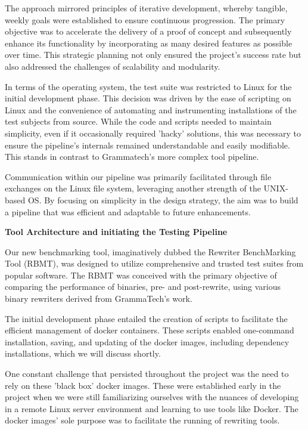 \documentclass[a4paper,11pt,oneside]{report}
\begin{document}
The approach mirrored principles of iterative development, whereby tangible, weekly goals were
established to ensure continuous progression. The primary objective
was to accelerate the delivery of a proof of concept and subsequently
enhance its functionality by incorporating as many desired features as possible over time.
This strategic planning not only ensured the project's success rate but also addressed the
challenges of scalability and modularity.

In terms of the operating system, the test suite was restricted to Linux for
the initial development phase. This decision was driven by the ease of scripting on Linux and
the convenience of automating and instrumenting installations of the test subjects from
source. While the code and scripts needed to maintain simplicity, even if it occasionally
required 'hacky' solutions, this was necessary to ensure the pipeline's internals remained
understandable and easily modifiable. This stands in contrast to Grammatech’s more complex tool pipeline.

Communication within our pipeline was primarily facilitated through file exchanges
on the Linux file system, leveraging another strength of the UNIX-based OS. By focusing on
simplicity in the design strategy, the aim was to build a pipeline that was efficient and adaptable to future enhancements.

\textbf{Tool Architecture and initiating the Testing Pipeline}

Our new benchmarking tool, imaginatively dubbed the Rewriter BenchMarking Tool
(RBMT), was designed to utilize comprehensive and trusted test suites from popular
software. The RBMT was conceived with the primary objective of comparing the
performance of binaries, pre- and post-rewrite, using various binary rewriters derived from
GrammaTech's work.

The initial development phase entailed the creation of scripts to facilitate the
efficient management of docker containers. These scripts enabled one-command
installation, saving, and updating of the docker images, including dependency installations,
which we will discuss shortly.

One constant challenge that persisted throughout the project was the need to rely
on these 'black box' docker images. These were established early in the project when we
were still familiarizing ourselves with the nuances of developing in a remote Linux server
environment and learning to use tools like Docker. The docker images' sole purpose was to
facilitate the running of rewriting tools.
\end{document}
